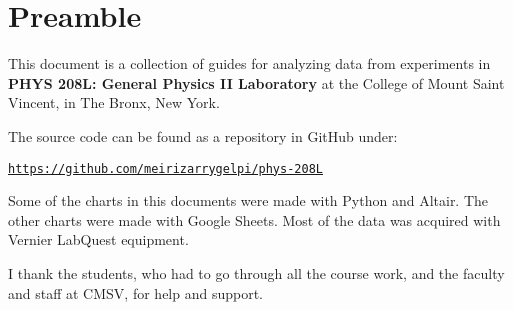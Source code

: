\chapter*{Preamble}
%
This document is a collection of guides for analyzing data from experiments in \textbf{PHYS 208L: General Physics II Laboratory} at the College of Mount Saint Vincent, in The Bronx, New York.

The source code can be found as a repository in GitHub under:
\begin{center}
    \href{https://github.com/meirizarrygelpi/phys-208L}{\texttt{https://github.com/meirizarrygelpi/phys-208L}}
\end{center}
Some of the charts in this documents were made with Python and Altair. The other charts were made with Google Sheets. Most of the data was acquired with Vernier LabQuest equipment.

I thank the students, who had to go through all the course work, and the faculty and staff at CMSV, for help and support.